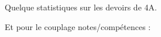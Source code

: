 
Quelque statistiques sur les devoirs de 4A.

\begin{center}
   
\end{center}

Et pour le couplage notes/compétences :
\begin{center}

\end{center}

